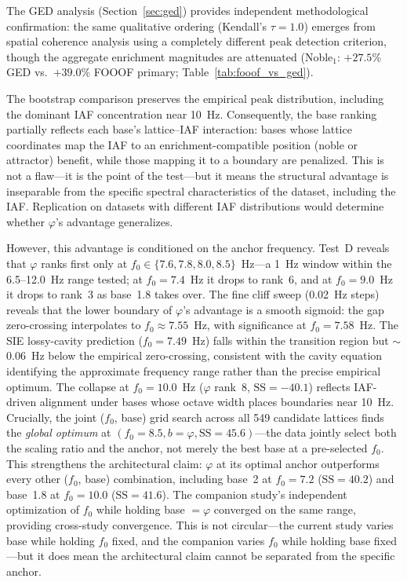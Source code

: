 \documentclass[11pt,a4paper]{article}
\newcommand{\phisym}{\varphi}
\newcommand{\fzero}{f_0}
\begin{document}
The GED analysis (Section~\ref{sec:ged}) provides independent methodological confirmation: the same qualitative ordering (Kendall's $\tau = 1.0$) emerges from spatial coherence analysis using a completely different peak detection criterion, though the aggregate enrichment magnitudes are attenuated (Noble$_1$: $+27.5\%$ GED vs.\ $+39.0\%$ FOOOF primary; Table~\ref{tab:fooof_vs_ged}).

The bootstrap comparison preserves the empirical peak distribution, including the dominant IAF concentration near 10~Hz. Consequently, the base ranking partially reflects each base's lattice--IAF interaction: bases whose lattice coordinates map the IAF to an enrichment-compatible position (noble or attractor) benefit, while those mapping it to a boundary are penalized. This is not a flaw---it is the point of the test---but it means the structural advantage is inseparable from the specific spectral characteristics of the dataset, including the IAF. Replication on datasets with different IAF distributions would determine whether $\phisym$'s advantage generalizes.

However, this advantage is conditioned on the anchor frequency. Test~D reveals that $\phisym$ ranks first only at $\fzero \in \{7.6, 7.8, 8.0, 8.5\}$~Hz---a 1~Hz window within the 6.5--12.0~Hz range tested; at $\fzero = 7.4$~Hz it drops to rank~6, and at $\fzero = 9.0$~Hz it drops to rank~3 as base~1.8 takes over. The fine cliff sweep (0.02~Hz steps) reveals that the lower boundary of $\phisym$'s advantage is a smooth sigmoid: the gap zero-crossing interpolates to $\fzero \approx 7.55$~Hz, with significance at $\fzero = 7.58$~Hz. The SIE lossy-cavity prediction ($\fzero = 7.49$~Hz) falls within the transition region but $\sim$0.06~Hz below the empirical zero-crossing, consistent with the cavity equation identifying the approximate frequency range rather than the precise empirical optimum. The collapse at $\fzero = 10.0$~Hz ($\phisym$ rank~8, $\text{SS} = -40.1$) reflects IAF-driven alignment under bases whose octave width places boundaries near 10~Hz. Crucially, the joint ($\fzero$, base) grid search across all 549 candidate lattices finds the \emph{global optimum} at $(\fzero = 8.5, b = \phisym, \text{SS} = 45.6)$---the data jointly select both the scaling ratio and the anchor, not merely the best base at a pre-selected $\fzero$. This strengthens the architectural claim: $\phisym$ at its optimal anchor outperforms every other ($\fzero$, base) combination, including base~2 at $\fzero = 7.2$ ($\text{SS} = 40.2$) and base~1.8 at $\fzero = 10.0$ ($\text{SS} = 41.6$). The companion study's independent optimization of $\fzero$ while holding base $= \phisym$ converged on the same range, providing cross-study convergence. This is not circular---the current study varies base while holding $\fzero$ fixed, and the companion varies $\fzero$ while holding base fixed---but it does mean the architectural claim cannot be separated from the specific anchor.
\end{document}
